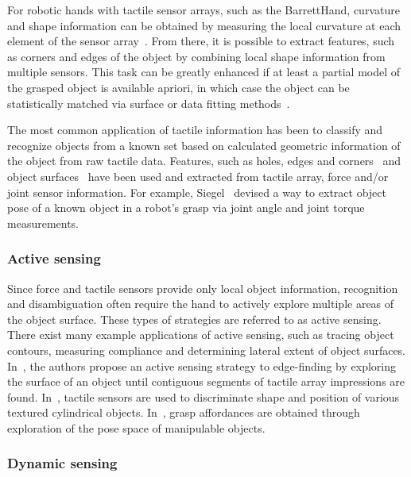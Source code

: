 For robotic hands with tactile sensor arrays, such as the BarrettHand, curvature and shape information can be obtained by measuring the local curvature at each element of the sensor array~\cite{cutkosky2008force}.
From there, it is possible to extract features, such as corners and edges of the object by combining local shape information from multiple sensors.
This task can be greatly enhanced if at least a partial model of the grasped object is available apriori, in which case the object can be statistically matched via surface or data fitting methods~\cite{fearing1990tactile}.

The most common application of tactile information has been to classify and recognize objects from a known set based on calculated geometric information of the object from raw tactile data.
Features, such as holes, edges and corners~\cite{cutkosky2008force} and object surfaces~\cite{overton1981tactile} have been used and extracted from tactile array, force and/or joint sensor information.
For example, Siegel~\cite{siegel1991finding} devised a way to extract object pose of a known object in a robot's grasp via joint angle and joint torque measurements.

\subsubsection*{Active sensing}
Since force and tactile sensors provide only local object information, recognition and disambiguation often require the hand to actively explore multiple areas of the object surface.
These types of strategies are referred to as active sensing.
There exist many example applications of active sensing, such as tracing object contours, measuring compliance and determining lateral extent of object surfaces.
In~\cite{muthukrishnan1987edge}, the authors propose an active sensing strategy to edge-finding by exploring the surface of an object until contiguous segments of tactile array impressions are found.
In~\cite{lepora2012embodied}, tactile sensors are used to discriminate shape and position of various textured cylindrical objects.
In~\cite{Detry2011}, grasp affordances are obtained through exploration of the pose space of manipulable objects. 

\subsubsection*{Dynamic sensing}

